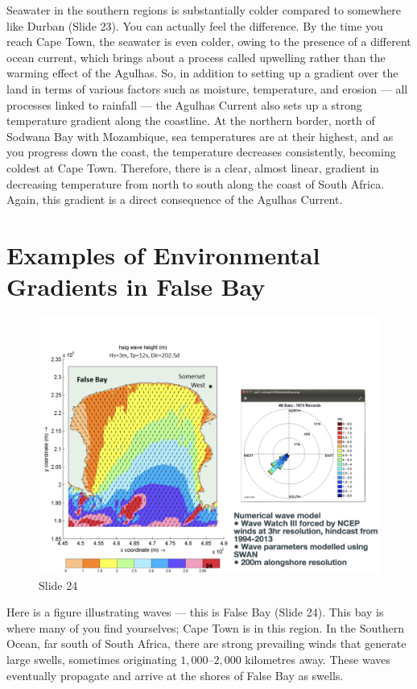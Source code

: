\documentclass[
  11pt,
]{book}
\begin{document}
Seawater in the southern regions is substantially colder compared to
somewhere like Durban (Slide 23). You can actually feel the difference.
By the time you reach Cape Town, the seawater is even colder, owing to
the presence of a different ocean current, which brings about a process
called upwelling rather than the warming effect of the Agulhas. So, in
addition to setting up a gradient over the land in terms of various
factors such as moisture, temperature, and erosion --- all processes
linked to rainfall --- the Agulhas Current also sets up a strong
temperature gradient along the coastline. At the northern border, north
of Sodwana Bay with Mozambique, sea temperatures are at their highest,
and as you progress down the coast, the temperature decreases
consistently, becoming coldest at Cape Town. Therefore, there is a
clear, almost linear, gradient in decreasing temperature from north to
south along the coast of South Africa. Again, this gradient is a direct
consequence of the Agulhas Current.

\section{Examples of Environmental Gradients in False
Bay}\label{examples-of-environmental-gradients-in-false-bay}

\begin{figure}[ht]
\centering
\includegraphics[width=0.8\linewidth]{../images/BDC334/BDC334-024.jpeg}
\caption*{Slide 24}
\end{figure}

Here is a figure illustrating waves --- this is False Bay (Slide 24).
This bay is where many of you find yourselves; Cape Town is in this
region. In the Southern Ocean, far south of South Africa, there are
strong prevailing winds that generate large swells, sometimes
originating \(1{,}000\)--\(2{,}000\) kilometres away. These waves
eventually propagate and arrive at the shores of False Bay as swells.
\end{document}
